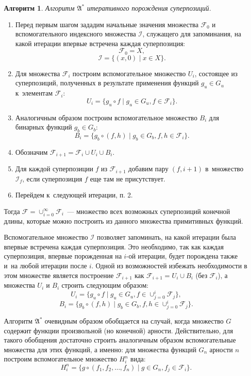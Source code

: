 \documentclass[12pt,a4paper]{article}
\newtheorem{algo}{Алгоритм}
\begin{document}
\begin{algo}
  Алгоритм $\mathfrak{A^*}$ итеративного порождения суперпозиций.
\end{algo}
\begin{enumerate}
  \item Перед первым шагом зададим начальные значения множества
	$\mathcal{F}_0$ и вспомогательного индексного множества $\mathcal{I}$,
	служащего для запоминания, на какой итерации впервые встречена
	каждая суперпозиция:
	\[
	  \mathcal{F}_0 = X,
	\]
	\[
	  \mathcal{I} = \{ (x, 0) \mid x \in X \}.
	\]
  \item Для множества $\mathcal{F}_i$ построим вспомогательное множество $U_i$,
	состоящее из суперпозиций, полученных в результате применения функций
	$g_u \in G_u$ к~элементам $\mathcal{F}_i$:
	\[
	  U_i = \{ g_u \circ f \mid g_u \in G_u, f \in \mathcal{F}_i \}.
	\]
  \item Аналогичным образом построим вспомогательное множество $B_i$ для
	бинарных функций $g_b \in G_b$:
	\[
	  B_i = \{ g_b \circ (f, h) \mid g_b \in G_b, f, h \in \mathcal{F}_i \}.
	\]
  \item Обозначим $\mathcal{F}_{i+1} = \mathcal{F}_i \cup U_i \cup B_i$.
  \item Для каждой суперпозиции $f$ из $\mathcal{F}_{i+1}$ добавим пару
	$(f, i+1)$ в~множество $\mathcal{I}_f$, если суперпозиция $f$ еще там
	не присутствует.
  \item Перейдем к~следующей итерации, п. 2. 
\end{enumerate}

Тогда $\mathcal{F} = \cup_{i=0}^\infty \mathcal{F}_i$~--- множество всех
возможных суперпозиций конечной длины, которые можно построить из
данного множества примитивных функций.

Вспомогательное множество $\mathcal{I}$ позволяет запоминать, на какой
итерации была впервые встречена каждая суперпозиция. Это необходимо, так
как каждая суперпозиция, впервые порожденная на $i$-ой итерации, будет
порождена также и~на любой итерации после $i$. Одной из возможностей
избежать необходимости в этом множестве является построение
$\mathcal{F}_{i+1}$ как $\mathcal{F}_{i+1} = U_i \cup B_i$ (без
$\mathcal{F}_i$), а множества $U_i$ и $B_i$ строить следующим образом:
\[
  U_i = \{ g_u \circ f \mid g_u \in G_u, f \in \cup_{j=0}^{i} \mathcal{F}_j \},
\]
\[
  B_i = \{ g_b \circ (f, h) \mid g_b \in G_b, f, h \in \cup_{j=0}^{i} \mathcal{F}_j \}.
\]

Алгоритм $\mathfrak{A^*}$ очевидным образом обобщается на случай, когда
множество $G$ содержит функции произвольной (но конечной) арности.
Действительно, для такого обобщения достаточно строить аналогичным образом
вспомогательные множества для этих функций, а именно: для множества функций
$G_n$ арности $n$ построим вспомогательное множество $H_i^n$ вида:
\[
H_i^n = \{ g \circ (f_1, f_2, \dots, f_n) \mid g \in G_n, f_j \in \mathcal{F}_i \}.
\]
\end{document}
